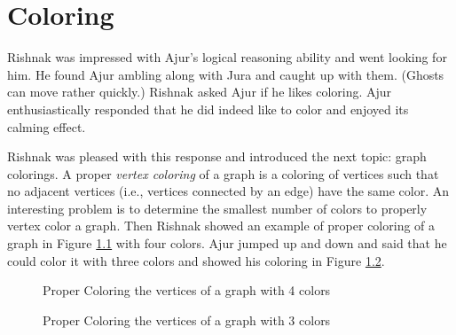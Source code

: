 \chapter{Coloring}
Rishnak  was impressed with Ajur's logical reasoning ability and went looking for him. He found Ajur ambling along with Jura and caught up with them. (Ghosts can move rather quickly.) Rishnak asked Ajur if he likes coloring.  Ajur enthusiastically responded that he did indeed like to color and enjoyed its calming effect.

Rishnak was pleased with this response and introduced the next topic: graph colorings. A proper \emph{vertex coloring} of a graph is a coloring of vertices such that no adjacent vertices (i.e., vertices connected by an edge) have the same color. An interesting problem is to determine the smallest number of colors to properly vertex color a graph. 
Then Rishnak showed an example of proper coloring of a graph in Figure \ref{10g1} with four colors. Ajur jumped up and down and said that he could color it with three colors and showed his coloring in Figure \ref{10g2}.
\begin{figure}[ht]
\begin{center}
\caption{ Proper Coloring the vertices of a graph with 4 colors}\label{10g1}
\end{center}
\end{figure}

\begin{figure}[ht]
\begin{center}
\caption{ Proper Coloring the vertices of a graph with 3 colors}\label{10g2}
\end{center}
\end{figure}


